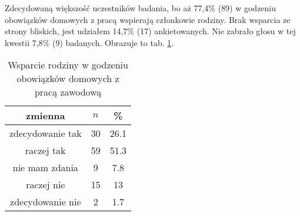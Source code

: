 


Zdecydowaną większość uczestników badania, bo aż 77,4\% (89) w godzeniu obowiązków  domowych z pracą wspierają członkowie rodziny. Brak wsparcia ze strony bliskich, jest udziałem 14,7\% (17) ankietowanych. Nie zabrało głosu w tej kwestii 7,8\% (9) badanych. Obrazuje to tab. \ref{tab:Q26}.





\begin{table}[H]
\caption{Wsparcie rodziny w godzeniu obowiązków domowych z pracą zawodową}
\centering
\begin{tabular}{ | c | c | c |}
\hline
zmienna & $n$ & \% \\
\hline
zdecydowanie tak  &  30  & 26.1 \\
\hline
raczej tak  &  59  & 51.3 \\
\hline
nie mam zdania  &  9  & 7.8 \\
\hline
raczej nie  &  15  & 13 \\
\hline
zdecydowanie nie  &  2  & 1.7\\
\hline
\end{tabular}
\label{tab:Q26}
\end{table}
